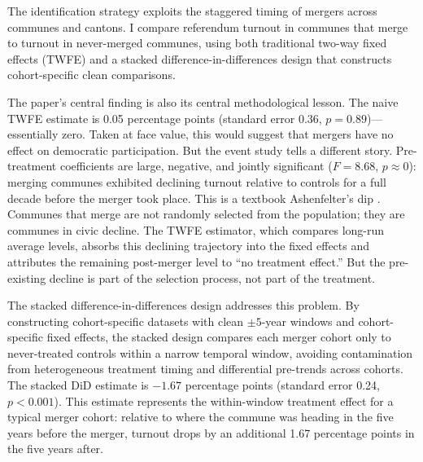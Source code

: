 \documentclass[12pt]{article}
\begin{document}
The identification strategy exploits the staggered timing of mergers across communes and cantons. I compare referendum turnout in communes that merge to turnout in never-merged communes, using both traditional two-way fixed effects (TWFE) and a stacked difference-in-differences design that constructs cohort-specific clean comparisons.

The paper's central finding is also its central methodological lesson. The naive TWFE estimate is 0.05 percentage points (standard error 0.36, $p = 0.89$)---essentially zero. Taken at face value, this would suggest that mergers have no effect on democratic participation. But the event study tells a different story. Pre-treatment coefficients are large, negative, and jointly significant ($F = 8.68$, $p \approx 0$): merging communes exhibited declining turnout relative to controls for a full decade before the merger took place. This is a textbook Ashenfelter's dip \citep{ashenfelter1978estimating}. Communes that merge are not randomly selected from the population; they are communes in civic decline. The TWFE estimator, which compares long-run average levels, absorbs this declining trajectory into the fixed effects and attributes the remaining post-merger level to ``no treatment effect.'' But the pre-existing decline is part of the selection process, not part of the treatment.

The stacked difference-in-differences design addresses this problem. By constructing cohort-specific datasets with clean $\pm 5$-year windows and cohort-specific fixed effects, the stacked design compares each merger cohort only to never-treated controls within a narrow temporal window, avoiding contamination from heterogeneous treatment timing and differential pre-trends across cohorts. The stacked DiD estimate is $-1.67$ percentage points (standard error 0.24, $p < 0.001$). This estimate represents the within-window treatment effect for a typical merger cohort: relative to where the commune was heading in the five years before the merger, turnout drops by an additional 1.67 percentage points in the five years after.
\end{document}
